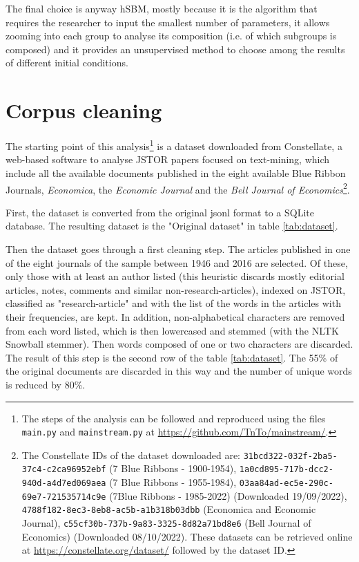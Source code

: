 \documentclass[a4paper, 11pt, headings=standardclasses, tablecaptionsbelow]{scrartcl}
\begin{document}
The final choice is anyway hSBM, mostly because it is the algorithm that requires the researcher to input the smallest number of parameters, it allows zooming into each group to analyse its composition (i.e. of which subgroups is composed) and it provides an unsupervised method to choose among the results of different initial conditions.

\section{Corpus cleaning}
The starting point of this analysis\footnote{The steps of the analysis can be followed and reproduced using the files \texttt{main.py} and \texttt{mainstream.py} at \url{https://github.com/TnTo/mainstream/}.} is a dataset downloaded from Constellate, a web-based software to analyse JSTOR papers focused on text-mining, which include all the available documents published in the eight available Blue Ribbon Journals, \textit{Economica}, the \textit{Economic Journal} and the \textit{Bell Journal of Economics}\footnote{The Constellate IDs of the dataset downloaded are: \texttt{31bcd322-032f-2ba5-37c4-c2ca96952ebf} (7 Blue Ribbons - 1900-1954), \texttt{1a0cd895-717b-dcc2-940d-a4d7ed069aea} (7 Blue Ribbons - 1955-1984), \texttt{03aa84ad-ec5e-290c-69e7-721535714c9e} (7Blue Ribbons - 1985-2022) (Downloaded 19/09/2022), \texttt{4788f182-8ec3-8eb8-ac5b-a1b318b03dbb} (Economica and Economic Journal), \texttt{c55cf30b-737b-9a83-3325-8d82a71bd8e6} (Bell Journal of Economics) (Downloaded 08/10/2022). These datasets can be retrieved online at \url{https://constellate.org/dataset/} followed by the dataset ID.}.



First, the dataset is converted from the original jsonl format to a SQLite database. The resulting dataset is the "Original dataset" in table \ref*{tab:dataset}.

Then the dataset goes through a first cleaning step. The articles published in one of the eight journals of the sample between 1946 and 2016 are selected. Of these, only those with at least an author listed (this heuristic discards mostly editorial articles, notes, comments and similar non-research-articles), indexed on JSTOR, classified as "research-article" and with the list of the words in the articles with their frequencies, are kept. In addition, non-alphabetical characters are removed from each word listed, which is then lowercased and stemmed (with the NLTK Snowball stemmer). Then words composed of one or two characters are discarded.
The result of this step is the second row of the table \ref{tab:dataset}.
The 55\% of the original documents are discarded in this way and the number of unique words is reduced by 80\%.
\end{document}
